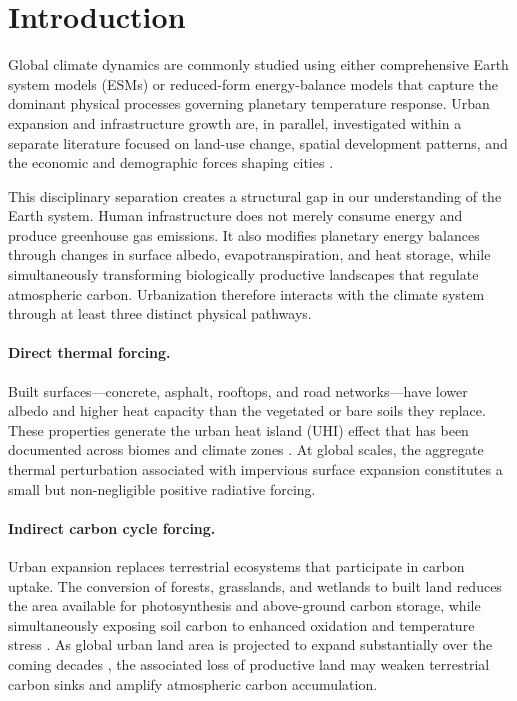 \documentclass[12pt]{article}
\begin{document}
\newpage
\tableofcontents
\newpage

\section{Introduction}
\label{sec:intro}

Global climate dynamics are commonly studied using either comprehensive
Earth system models (ESMs) or reduced-form energy-balance models that capture
the dominant physical processes governing planetary temperature response.
Urban expansion and infrastructure growth are, in parallel, investigated within
a separate literature focused on land-use change, spatial development patterns,
and the economic and demographic forces shaping cities
\citep{Batty2013,Angel2011,Seto2012}.

This disciplinary separation creates a structural gap in our understanding of
the Earth system.  Human infrastructure does not merely consume energy and
produce greenhouse gas emissions.  It also modifies planetary energy balances
through changes in surface albedo, evapotranspiration, and heat storage, while
simultaneously transforming biologically productive landscapes that regulate
atmospheric carbon.  Urbanization therefore interacts with the climate system
through at least three distinct physical pathways.

\paragraph{Direct thermal forcing.}
Built surfaces---concrete, asphalt, rooftops, and road networks---have lower
albedo and higher heat capacity than the vegetated or bare soils they replace.
These properties generate the urban heat island (UHI) effect that has been
documented across biomes and climate zones \citep{Oke1982,Zhao2014,Imhoff2010}.
At global scales, the aggregate thermal perturbation associated with impervious
surface expansion constitutes a small but non-negligible positive radiative
forcing.

\paragraph{Indirect carbon cycle forcing.}
Urban expansion replaces terrestrial ecosystems that participate in carbon
uptake.  The conversion of forests, grasslands, and wetlands to built land
reduces the area available for photosynthesis and above-ground carbon storage,
while simultaneously exposing soil carbon to enhanced oxidation and temperature
stress \citep{Davidson2006}.  As global urban land area is projected to expand
substantially over the coming decades \citep{Seto2012}, the associated loss of
productive land may weaken terrestrial carbon sinks and amplify atmospheric
carbon accumulation.
\end{document}
